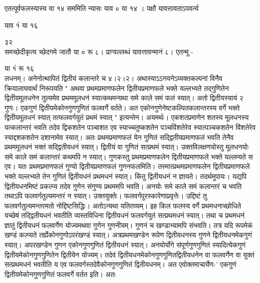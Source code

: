 \documentclass[11pt, openany]{book}
\begin{document}
\begin{sloppypar}
\hangindent=0.2in एतत्पूर्वफलस्यास्य या १४ सममिति न्यासः याव ० या १४ । पक्षौ यावत्तावताऽपवर्त्य

\hspace{2.65in}याव १ं या १६

\hspace{3.3in}३२\\

\hangindent=0.2in समच्छेदीकृत्य च्छेदगमे जातौ या ० रू ८। प्राग्वल्लब्धं यावत्तावन्मानं ८। एतन्मू -

\hspace{2in}या १ं रू १६\\

\hangindent=0.2in लधनम्। अनेनोत्थापितं द्वितीयं कलान्तरे च ४।२।२। अथास्याऽऽनयनेऽव्यक्तकल्पनां विनैव क्रियालाघवार्थं निरूपयति " अथवा प्रथमप्रमाणफलेन द्वितीयप्रमाणफले भक्ते यल्लभ्यते तद्गुणितेन द्वितीयमूलधनेन तुल्यमेव प्रथममूलधनं स्यात्कथमन्यथा समे काले समं फलं स्यात्। अतो द्वितीयस्यायं २ गुणः। एकगुणं द्वितीयमेकोनगुणगुणितं फलवर्गे वर्तते। अत एकोनगुणेनेष्टकल्पितकलान्तरस्य वर्गे भक्ते द्वितीयमूलधनं स्यात् तत्फलवर्गयुतं प्रथमं स्यात् " इत्यन्तेन। अयमर्थः। एकशतप्रमाणेन शतस्य मूलधनस्य यत्कलान्तरं भवति तदेव द्विकशतेन पञ्चाशत एव स्याच्चतुष्कशतेन पञ्चविंशतेरेव स्यात्पञ्चकशतेन विंशतेरेव स्याद्दशकशतेन दशानामेव स्यात्। अतः प्रथमप्रमाणफलं येन गुणितं सद्द्वितीयप्रमाणफलं भवति तेनैव प्रथममूलधनं भक्तं सद्द्वितीयधनं स्यात्। द्वितीयं वा गुणितं सत्प्रथमं स्यात्। उक्तविलक्षणयोस्तु मूलधनयोः समे काले समं कलान्तरं कथमपि न स्यात्। गुणकस्तु प्रथमप्रमाणफलेन द्वितीयप्रमाणफले भक्ते यल्लम्यते स एव। यतः प्रथमप्रमाणफलं गुण्यो द्वितीयप्रमाणफलं गुणनफलमिति। तस्मात्प्रथमप्रमाणफलेन द्वितीयप्रमाणफले भक्ते यल्लभ्यते तेन गुणितं द्वितीयधनं प्रथमधनं स्यात्। किंतु द्वितीयधनं न ज्ञायते। तदर्थमुपायः। यद्यपि द्वितीयधनमिष्टं प्रकल्प्य तदेव गुणेन संगुण्य प्रथममपि भवति। अनयोः समे काले समं कलान्तरं च भवति तथाऽपि फलवर्गतुल्यमन्तरं न स्यात्। उक्तयुक्तेः। फलवर्गपुरस्कारेणाप्रवृत्तेः। उद्दिष्टं तु फलवर्गतुल्यमन्तरमतो नोद्दिष्टसिद्धिः। अतोऽन्यथा यतितव्यम्। इह किल फलस्य वर्गे प्रथमधनाच्छोधिते यच्छेषं तद्द्वितीयधनं भवतीति व्यस्तविधिना द्वितीयधनं फलवर्गयुतं सत्प्रथमधनं स्यात्। तथा च प्रथमधनं ज्ञातुं द्वितीयधनं फलवर्गेण योज्यमथवा गुणेन गुणनीयम्। गुणनं च खण्डाभ्यामपि संभवति। तत्र यदि रूपमेकं खण्डं कल्प्यते तर्ह्येकोनगुणोऽपरंखण्डं स्यात्। अत्रप्रथमखण्डेन रूपेण द्वितीयधनस्य गुणने द्वितीयधनमेकगुणं स्यात्। अपरखण्डेन गुणन एकोनगुणगुणितं द्वितीयधनं स्यात्। अनयोर्योगे संपूर्णगुणगुणितं स्यादित्येकगुणं द्वितीयमेकोनगुणगुणितेन द्वितीयेन योज्यम्। तदेवं द्वितीयधनमेकोनगुणगुणितद्वितीयधनेन वा फलवर्गेण वा युक्तं सत्प्रथमधनं भवतीति य एव फलवर्गस्तदेवैकोनगुणगुणितं द्वितीयधनम्। अत एवोक्तमाचार्येण-' एकगुणं द्वितीयमेकोनगुणगुणितं फलवर्गे वर्तत इति। अतः
\end{sloppypar}
\thispagestyle{empty}
\newpage
\end{document}
